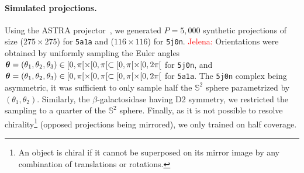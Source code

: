 \paragraph{Simulated projections.}
Using the ASTRA projector~\cite{van2015astra}, we generated $P=5,000$ synthetic projections of size ($275\times 275$) for \texttt{5a1a} and ($116\times 116$) for \texttt{5j0n}. 
\textcolor{red}{Jelena:} Orientations were obtained by uniformly sampling the Euler angles ${\boldsymbol{\theta}}=(\theta_1,\theta_2,\theta_3) \in [0, \pi[ \times [0, \pi[ \subset [0, \pi[ \times [0, 2\pi[$ for \texttt{5j0n}, and ${\boldsymbol{\theta}}=(\theta_1,\theta_2,\theta_3) \in [0, \pi[ \times [0, \pi[ \subset [0, \pi[ \times [0, 2\pi[$ for \texttt{5a1a}.
The \texttt{5j0n} complex being asymmetric, it was sufficient to only sample half  the $\mathbb{S}^2$ sphere parametrized by $(\theta_1,\theta_2)$.
Similarly, the $\beta$-galactosidase having D2 symmetry, %
 we restricted the sampling to a quarter of the $\mathbb{S}^2$ sphere.
Finally, as it is not possible to resolve chirality\footnote{An object is chiral if it cannot be superposed on its mirror image by any combination of translations or rotations.} (opposed projections being mirrored), we only trained on half coverage.

